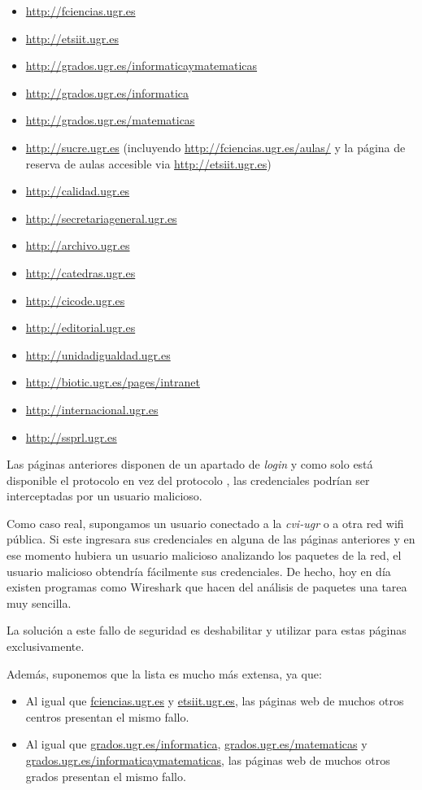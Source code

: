 \begin{itemize}
  \setlength\itemsep{0.1em}
  \item \url{http://fciencias.ugr.es}
  \item \url{http://etsiit.ugr.es}
  \item \url{http://grados.ugr.es/informaticaymatematicas}
  \item \url{http://grados.ugr.es/informatica}
  \item \url{http://grados.ugr.es/matematicas}
  \item \url{http://sucre.ugr.es} (incluyendo \url{http://fciencias.ugr.es/aulas/} y la página de reserva de aulas accesible via \url{http://etsiit.ugr.es})
  \item \url{http://calidad.ugr.es}
  \item \url{http://secretariageneral.ugr.es}
  \item \url{http://archivo.ugr.es}
  \item \url{http://catedras.ugr.es}
  \item \url{http://cicode.ugr.es}
  \item \url{http://editorial.ugr.es}
  \item \url{http://unidadigualdad.ugr.es}
  \item \url{http://biotic.ugr.es/pages/intranet}
  \item \url{http://internacional.ugr.es}
  \item \url{http://ssprl.ugr.es}
\end{itemize}

Las páginas anteriores disponen de un apartado de \emph{login} y como solo está disponible el protocolo   en vez del protocolo  , las credenciales podrían ser interceptadas por un usuario malicioso.

Como caso real, supongamos un usuario conectado a la \emph{cvi-ugr} o a otra red wifi pública. Si este ingresara sus credenciales en alguna de las páginas anteriores y en ese momento hubiera un usuario malicioso analizando los paquetes de la red, el usuario malicioso obtendría fácilmente sus credenciales. De hecho, hoy en día existen programas como Wireshark que hacen del análisis de paquetes una tarea muy sencilla.

La solución a este fallo de seguridad es deshabilitar   y utilizar para estas páginas   exclusivamente.

Además, suponemos que la lista es mucho más extensa, ya que:
\begin{itemize}
  \item Al igual que \href{http://fciencias.ugr.es}{fciencias.ugr.es} y \href{http://etsiit.ugr.es}{etsiit.ugr.es}, las páginas web de muchos otros centros presentan el mismo fallo.
  \item Al igual que \href{http://grados.ugr.es/informatica}{grados.ugr.es/informatica}, \href{http://grados.ugr.es/matematicas}{grados.ugr.es/matematicas} y \href{http://grados.ugr.es/informaticaymatematicas}{grados.ugr.es/informaticaymatematicas}, las páginas web de muchos otros grados presentan el mismo fallo.
\end{itemize}

